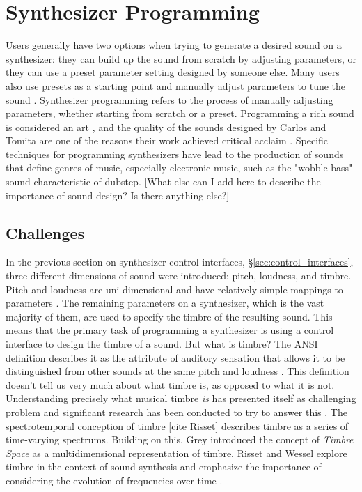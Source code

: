 \section{Synthesizer Programming}
Users generally have two options when trying to generate a desired sound on a synthesizer: they can build up the sound from scratch by adjusting parameters, or they can use a preset parameter setting designed by someone else. Many users also use presets as a starting point and manually adjust parameters to tune the sound \cite{krekovic2019insights}. Synthesizer programming refers to the process of manually adjusting parameters, whether starting from scratch or a preset. Programming a rich sound is considered an art \cite{russ2012sound}, and the quality of the sounds designed by Carlos and Tomita are one of the reasons their work achieved critical acclaim \cite{jenkins2019analog}. Specific techniques for programming synthesizers have lead to the production of sounds that define genres of music, especially electronic music, such as the "wobble bass" sound characteristic of dubstep. [What else can I add here to describe the importance of sound design? Is there anything else?]

\subsection{Challenges}
In the previous section on synthesizer control interfaces, \S\ref{sec:control_interfaces}, three different dimensions of sound were introduced: pitch, loudness, and timbre. Pitch and loudness are uni-dimensional and have relatively simple mappings to parameters \cite{seago2004critical}. The remaining parameters on a synthesizer, which is the vast majority of them, are used to specify the timbre of the resulting sound. This means that the primary task of programming a synthesizer is using a control interface to design the timbre of a sound. But what is timbre? The ANSI definition describes it as the attribute of auditory sensation that allows it to be distinguished from other sounds at the same pitch and loudness \cite{american1973american}. This definition doesn't tell us very much about what timbre is, as opposed to what it is not. Understanding precisely what musical timbre \textit{is} has presented itself as challenging problem \cite{krumhansl1989musical} and significant research has been conducted to try to answer this \cite{McAdams2019}. The spectrotemporal conception of timbre [cite Risset] describes timbre as a series of time-varying spectrums. Building on this, Grey introduced the concept of \textit{Timbre Space} \cite{grey1977multidimensional} as a multidimensional representation of timbre. Risset and Wessel explore timbre in the context of sound synthesis and emphasize the importance of considering the evolution of frequencies over time \cite{risset1999exploration}. 

